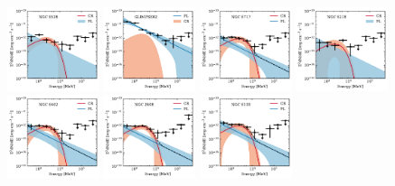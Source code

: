 \documentclass[doublespace,nopageskip]{VTthesis} %
\begin{document}
\begin{appendices}
\begin{figure}
\includegraphics[width=0.24\textwidth]{Figures/Globular/spectra/2comp_20.pdf}
\includegraphics[width=0.24\textwidth]{Figures/Globular/spectra/2comp_2.pdf}
\includegraphics[width=0.24\textwidth]{Figures/Globular/spectra/2comp_23.pdf}
\includegraphics[width=0.24\textwidth]{Figures/Globular/spectra/2comp_10.pdf}
\includegraphics[width=0.24\textwidth]{Figures/Globular/spectra/2comp_17.pdf}
\includegraphics[width=0.24\textwidth]{Figures/Globular/spectra/2comp_5.pdf}
\includegraphics[width=0.24\textwidth]{Figures/Globular/spectra/2comp_9.pdf}

\end{figure}
\end{appendices}
\end{document}
